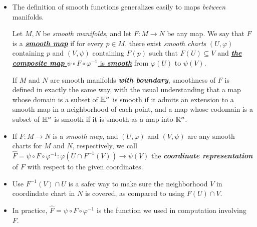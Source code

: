 \documentclass[11pt]{article}
\begin{document}
\begin{itemize}
\item The definition of smooth functions generalizes easily to maps \emph{between} manifolds.
\begin{definition}
Let $M, N$ be \emph{smooth manifolds}, and let $F: M \rightarrow N$ be any map. We say that $F$ is a \underline{\emph{\textbf{smooth map}}} if for every $p \in M$, there exist \emph{smooth charts} $(U, \varphi)$ containing $p$ and $(V, \psi)$ containing $F(p)$ such that $F(U) \subseteq V$ and \underline{\emph{\textbf{the composite map}} $\psi \circ F \circ \varphi^{-1}$ is \emph{\textbf{smooth}}} from $\varphi(U)$ to $\psi(V)$. 

If $M$ and $N$ are smooth manifolds \emph{\textbf{with boundary}}, smoothness of $F$ is defined in exactly the same way, with the usual understanding that a map whose domain is a subset of ${\mathbb H}^n$ is smooth if it admits an extension to a smooth map in a neighborhood of each point, and a map whose codomain is a subset of ${\mathbb H}^n$ is smooth if it is smooth as a map into ${\mathbb R}^n$.
\end{definition}

\item 
\begin{definition}
If $F: M \rightarrow N$ is a \emph{smooth map}, and $(U, \varphi)$ and $(V, \psi)$ are any smooth charts for $M$ and $N$, respectively, we call  \underline{$\widehat{F} = \psi \circ F \circ \varphi^{-1}: \varphi(U\cap F^{-1}(V)) \rightarrow \psi(V)$} the \emph{\textbf{coordinate representation}} of $F$ with respect to the given coordinates. 
\end{definition}

\item \begin{remark}
Use  $F^{-1}(V) \cap U$ is a safer way to make sure the neighborhood $V$ in coordindate chart in $N$ is covered, as compared to using $F(U)\cap V$.
\end{remark}

\item \begin{remark}
In practice, $\widehat{F} = \psi \circ F \circ \varphi^{-1}$ is the function we used in computation involving $F$.
\end{remark}


\end{itemize}
\end{document}
